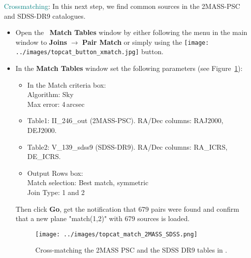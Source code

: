 \documentclass [a4paper, 12pt]{article}
\begin{document}
\noindent \textcolor{teal}{Crossmatching}: In this next step, we find common
sources in the 2MASS-PSC and SDSS-DR9 catalogues.
\begin{itemize}
    \item Open the \topcat\ \textbf{Match Tables} window by either following
    the menu in the main window to \textbf{Joins} $\rightarrow$ \textbf{Pair
    Match} or simply using the \texttt{[image: ../images/topcat\_button\_xmatch.jpg]} button.
    \item In the \textbf{Match Tables} window set the following parameters (see
    Figure~\ref{fig:crossmatch_topcat}):
    \begin{itemize}
        \item In the Match criteria box:\\
        Algorithm: Sky\\
        Max error: 4\,arcsec
        \item Table1: II\_246\_out (2MASS-PSC). RA/Dec columns: RAJ2000,
        DEJ2000.
        \item Table2: V\_139\_sdss9 (SDSS-DR9). RA/Dec columns: RA\_ICRS,
        DE\_ICRS.
        \item Output Rows box:\\
        Match selection: Best match, symmetric\\
        Join Type: 1 and 2
    \end{itemize}
    Then click \textbf{Go}, get the notification that 679 pairs were found and
    confirm that a new plane "match(1,2)" with 679 sources is loaded.
    \begin{figure}[H]
        \center
        \texttt{[image: ../images/topcat\_match\_2MASS\_SDSS.png]}
        \caption{Cross-matching the 2MASS PSC and the SDSS DR9 tables in
        \topcat. }
        \label{fig:crossmatch_topcat}
    \end{figure}
\end{itemize}
\end{document}
